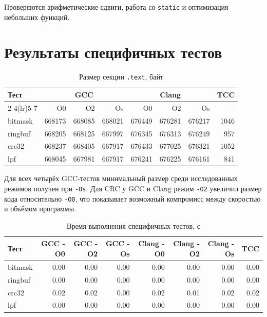 \documentclass[12pt,a4paper]{article}
\begin{document}
Проверяются арифметические сдвиги, работа со \texttt{static} и оптимизация небольших функций.

\section{Результаты специфичных тестов}

\begin{table}[H]
\centering
\caption{Размер секции \texttt{.text}, байт}
\small
\begin{tabular}{lrrrrrrr}
\toprule
Тест & \multicolumn{3}{c}{GCC} & \multicolumn{3}{c}{Clang} & TCC \\
\cmidrule(lr){2-4}\cmidrule(lr){5-7}
 & -O0 & -O2 & -Os & -O0 & -O2 & -Os & --- \\
\midrule
bitmask & 668173 & 668085 & 668021 & 676449 & 676281 & 676217 & 1046 \\
ringbuf & 668205 & 668125 & 667997 & 676345 & 676313 & 676249 & 957 \\
crc32   & 668237 & 668405 & 667917 & 676433 & 677025 & 676321 & 1052 \\
lpf     & 668045 & 667981 & 667917 & 676241 & 676225 & 676161 & 841 \\
\bottomrule
\end{tabular}
\end{table}

Для всех четырёх GCC-тестов минимальный размер среди исследованных режимов получен при \texttt{-Os}. Для CRC у GCC и Clang режим \texttt{-O2} увеличил размер кода относительно \texttt{-O0}, что показывает возможный компромисс между скоростью и объёмом программы.

\begin{table}[H]
\centering
\caption{Время выполнения специфичных тестов, с}
\small
\begin{tabular}{lrrrrrrr}
\toprule
Тест & GCC -O0 & GCC -O2 & GCC -Os & Clang -O0 & Clang -O2 & Clang -Os & TCC \\
\midrule
bitmask & 0.00 & 0.00 & 0.00 & 0.00 & 0.00 & 0.00 & 0.00 \\
ringbuf & 0.00 & 0.00 & 0.00 & 0.00 & 0.00 & 0.00 & 0.00 \\
crc32 & 0.02 & 0.02 & 0.00 & 0.02 & 0.01 & 0.02 & 0.02 \\
lpf & 0.00 & 0.00 & 0.00 & 0.00 & 0.00 & 0.00 & 0.00 \\
\bottomrule
\end{tabular}
\end{table}
\end{document}

